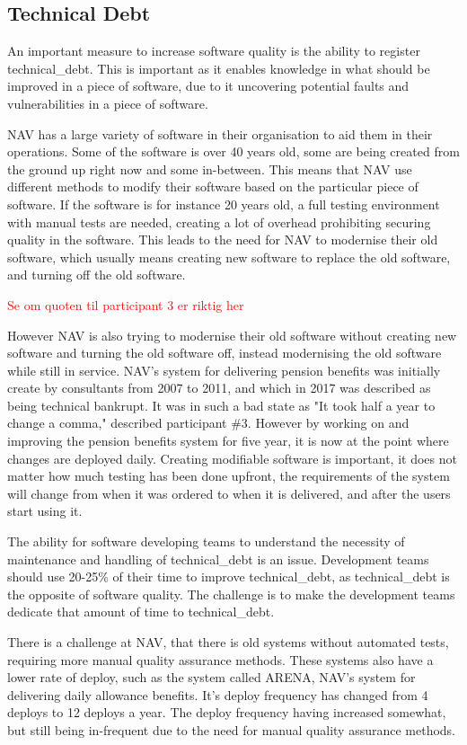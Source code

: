 \subsection{Technical Debt}
An important measure to increase software quality is the ability to register \gls{technical_debt}. This is important as it enables knowledge in what should be improved in a piece of software, due to it uncovering potential faults and vulnerabilities in a piece of software.

NAV has a large variety of software in their organisation to aid them in their operations. Some of the software is over 40 years old, some are being created from the ground up right now and some in-between. This means that NAV use different methods to modify their software based on the particular piece of software. If the software is for instance 20 years old, a full testing environment with manual tests are needed, creating a lot of overhead prohibiting securing quality in the software. This leads to the need for NAV to modernise their old software, which usually means creating new software to replace the old software, and turning off the old software.

\textcolor{red}{Se om quoten til participant 3 er riktig her}

However NAV is also trying to modernise their old software without creating new software and turning the old software off, instead modernising the old software while still in service. NAV's system for delivering pension benefits was initially create by consultants from 2007 to 2011, and which in 2017 was described as being technical bankrupt. It was in such a bad state as "It took half a year to change a comma," described participant \#3. However by working on and improving the pension benefits system for five year, it is now at the point where changes are deployed daily. Creating modifiable software is important, it does not matter how much testing has been done upfront, the requirements of the system will change from when it was ordered to when it is delivered, and after the users start using it.

The ability for software developing teams to understand the necessity of maintenance and handling of \gls{technical_debt} is an issue. Development teams should use 20-25\% of their time to improve \gls{technical_debt}, as \gls{technical_debt} is the opposite of software quality. The challenge is to make the development teams dedicate that amount of time to \gls{technical_debt}.

There is a challenge at NAV, that there is old systems without automated tests, requiring more manual quality assurance methods. These systems also have a lower rate of deploy, such as the system called ARENA, NAV's system for delivering daily allowance benefits. It's deploy frequency has changed from 4 deploys to 12 deploys a year. The deploy frequency having increased somewhat, but still being in-frequent due to the need for manual quality assurance methods.

